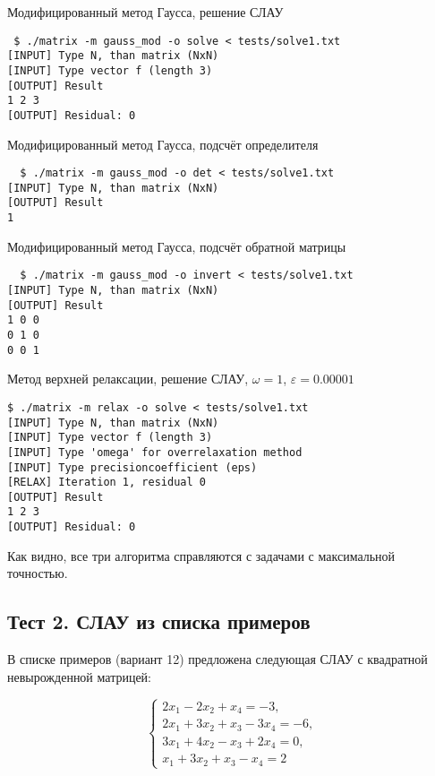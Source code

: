 \documentclass[a4paper,11pt]{report}
\begin{document}
\begin{bash}
\caption{Модифицированный метод Гаусса, решение СЛАУ}
\begin{verbatim}
 $ ./matrix -m gauss_mod -o solve < tests/solve1.txt 
[INPUT] Type N, than matrix (NxN)
[INPUT] Type vector f (length 3)
[OUTPUT] Result
1 2 3 
[OUTPUT] Residual: 0
\end{verbatim}
\end{bash}
\begin{bash}
 \caption{Модифицированный метод Гаусса, подсчёт определителя}
 \begin{verbatim}
  $ ./matrix -m gauss_mod -o det < tests/solve1.txt 
[INPUT] Type N, than matrix (NxN)
[OUTPUT] Result
1
 \end{verbatim}
\end{bash}

\begin{bash}
 \caption{Модифицированный метод Гаусса, подсчёт обратной матрицы}
 \begin{verbatim}
  $ ./matrix -m gauss_mod -o invert < tests/solve1.txt 
[INPUT] Type N, than matrix (NxN)
[OUTPUT] Result
1 0 0 
0 1 0 
0 0 1 
 \end{verbatim}
\end{bash}

\begin{bash}
\caption{Метод верхней релаксации, решение СЛАУ, $\omega = 1$, $\varepsilon = 0.00001$}
\begin{verbatim}
$ ./matrix -m relax -o solve < tests/solve1.txt 
[INPUT] Type N, than matrix (NxN)
[INPUT] Type vector f (length 3)
[INPUT] Type 'omega' for overrelaxation method
[INPUT] Type precisioncoefficient (eps)
[RELAX] Iteration 1, residual 0
[OUTPUT] Result
1 2 3 
[OUTPUT] Residual: 0
\end{verbatim}
\end{bash}

Как видно, все три алгоритма справляются с задачами с максимальной точностью.

\subsection*{Тест 2. СЛАУ из списка примеров}

В списке примеров (вариант 12) предложена следующая СЛАУ с квадратной невырожденной матрицей:

$$
\begin{cases}
 2x_1 - 2x_2 + x_4 = -3,\\
 2x_1 + 3x_2 + x_3 - 3x_4 = -6,\\
 3x_1 + 4x_2 - x_3 + 2x_4 = 0,\\
 x_1 + 3x_2 + x_3 - x_4 = 2
\end{cases}
$$
\end{document}
